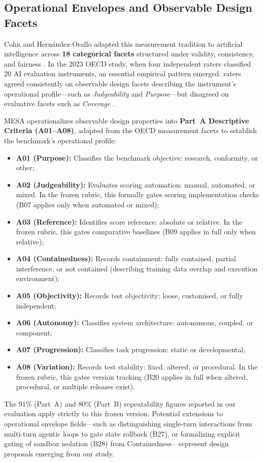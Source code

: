 \documentclass[runningheads]{llncs}
\begin{document}
\subsection{Operational Envelopes and Observable Design Facets}
Cohn and Hern\'andez-Orallo adapted this measurement tradition to artificial intelligence across \textbf{18 categorical facets} structured under validity, consistency, and fairness \cite{cohn_categorising_2022,cohn_hernandez_orallo_oecd_2023}. In the 2023 OECD study, when four independent raters classified 20 AI evaluation instruments, an essential empirical pattern emerged: raters agreed consistently on observable design facets describing the instrument's operational profile---such as \emph{Judgeability} and \emph{Purpose}---but disagreed on evaluative facets such as \emph{Coverage} \cite{cohn_hernandez_orallo_oecd_2023}.

MESA operationalizes observable design properties into \textbf{Part~A Descriptive Criteria (A01--A08)}, adapted from the OECD measurement facets \cite{cohn_hernandez_orallo_oecd_2023} to establish the benchmark's operational profile:
\begin{itemize}[leftmargin=*]
    \item \textbf{A01 (Purpose):} Classifies the benchmark objective: research, conformity, or other;
    \item \textbf{A02 (Judgeability):} Evaluates scoring automation: manual, automated, or mixed. In the frozen rubric, this formally gates scoring implementation checks (B07 applies only when automated or mixed);
    \item \textbf{A03 (Reference):} Identifies score reference: absolute or relative. In the frozen rubric, this gates comparative baselines (B09 applies in full only when relative);
    \item \textbf{A04 (Containedness):} Records containment: fully contained, partial interference, or not contained (describing training data overlap and execution environment);
    \item \textbf{A05 (Objectivity):} Records test objectivity: loose, customised, or fully independent;
    \item \textbf{A06 (Autonomy):} Classifies system architecture: autonomous, coupled, or component;
    \item \textbf{A07 (Progression):} Classifies task progression: static or developmental;
    \item \textbf{A08 (Variation):} Records test stability: fixed, altered, or procedural. In the frozen rubric, this gates version tracking (B20 applies in full when altered, procedural, or multiple releases exist).
\end{itemize}
The 91\% (Part~A) and 80\% (Part~B) repeatability figures reported in our evaluation apply strictly to this frozen version. Potential extensions to operational envelope fields---such as distinguishing single-turn interactions from multi-turn agentic loops to gate state rollback (B27), or formalizing explicit gating of sandbox isolation (B28) from Containedness---represent design proposals emerging from our study.
\end{document}
